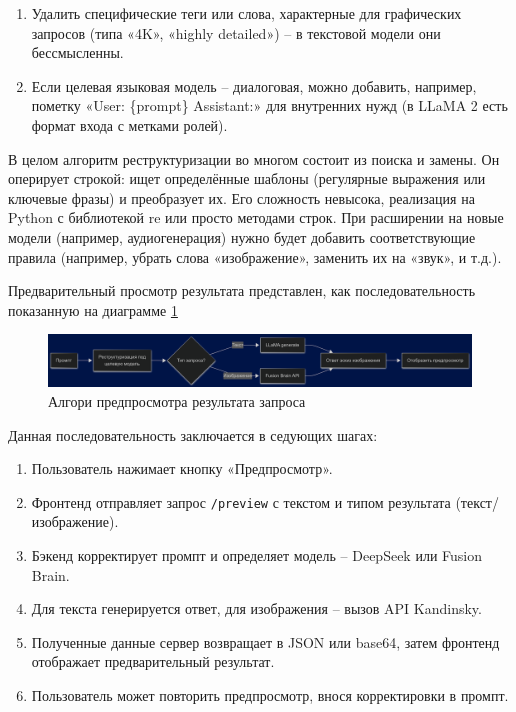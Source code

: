 \begin{enumerate}[label=\arabic*]
\begin{enumerate}[label=2.\arabic*]
        \item Удалить специфические теги или слова, характерные для графических запросов (типа «4K», «highly detailed») – в текстовой модели они бессмысленны.
        \item Если целевая языковая модель – диалоговая, можно добавить, например, пометку «User: \{prompt\} Assistant:» для внутренних нужд (в LLaMA 2 есть формат входа с метками ролей).
    \end{enumerate}
\end{enumerate}
В целом алгоритм реструктуризации во многом состоит из поиска и замены. Он оперирует строкой: ищет определённые шаблоны (регулярные выражения или ключевые фразы) и преобразует их. Его сложность невысока, реализация на Python с библиотекой re или просто методами строк. При расширении на новые модели (например, аудиогенерация) нужно будет добавить соответствующие правила (например, убрать слова «изображение», заменить их на «звук», и т.д.).

Предварительный просмотр результата представлен, как последовательность показанную на диаграмме \ref{algo-3}
\begin{figure}[htbp]
    \centering
    \includegraphics[width=1\textwidth]{picture/diploma-inter-algo-3.png}
    \caption{Алгори предпросмотра  результата запроса}
    \label{algo-3}
\end{figure}


Данная последовательность заключается в седующих шагах:
\begin{enumerate}[label=\arabic*)]
    \item Пользователь нажимает кнопку «Предпросмотр».
    \item Фронтенд отправляет запрос \texttt{/preview} с текстом и типом результата (текст/изображение).
    \item Бэкенд корректирует промпт и определяет модель – DeepSeek или Fusion Brain.
    \item Для текста генерируется ответ, для изображения – вызов API Kandinsky.
    \item Полученные данные сервер возвращает в JSON или base64, затем фронтенд отображает предварительный результат.
    \item Пользователь может повторить предпросмотр, внося корректировки в промпт.
\end{enumerate}

